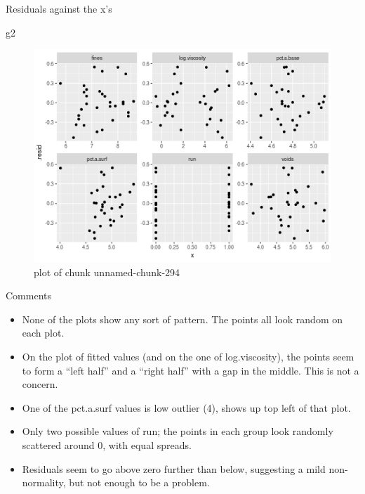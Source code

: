 \documentclass[ignorenonframetext,]{beamer}
\newenvironment{Shaded}{\begin{snugshade}}{\end{snugshade}}
\newcommand{\NormalTok}[1]{#1}
\providecommand{\tightlist}{%
  \setlength{\itemsep}{0pt}\setlength{\parskip}{0pt}}
\begin{document}
\begin{frame}[fragile]{Residuals against the x's}
\protect\hypertarget{residuals-against-the-xs}{}

\begin{Shaded}
\begin{Highlighting}[]
\NormalTok{g2}
\end{Highlighting}
\end{Shaded}

\begin{figure}
\centering
\includegraphics{figure/unnamed-chunk-294-1.png}
\caption{plot of chunk unnamed-chunk-294}
\end{figure}

\end{frame}

\begin{frame}{Comments}
\protect\hypertarget{comments-20}{}

\begin{itemize}
\tightlist
\item
  None of the plots show any sort of pattern. The points all look random
  on each plot.
\item
  On the plot of fitted values (and on the one of log.viscosity), the
  points seem to form a ``left half'' and a ``right half'' with a gap in
  the middle. This is not a concern.
\item
  One of the pct.a.surf values is low outlier (4), shows up top left of
  that plot.
\item
  Only two possible values of run; the points in each group look
  randomly scattered around 0, with equal spreads.
\item
  Residuals seem to go above zero further than below, suggesting a mild
  non-normality, but not enough to be a problem.
\end{itemize}

\end{frame}
\end{document}
